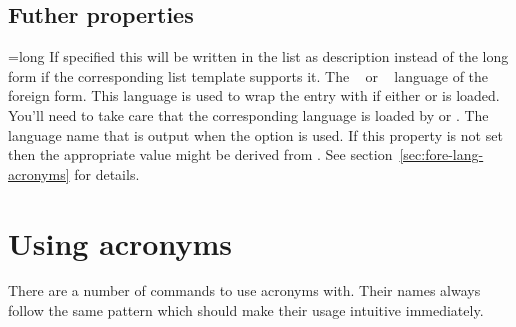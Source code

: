 \documentclass{acro-manual}
\begin{document}
\subsection{Futher properties}\label{sec:futher-properties}
\begin{properties}
  \Default={long}
    If specified this will be written in the list as description instead of
    the long form if the corresponding list template supports it.
  \Default
    The ~\cite{pkg:babel} or
    ~\cite{pkg:polyglossia} language of the foreign form.
    This language is used to wrap the entry with
     if either  or
     is loaded.  You'll need to take care that the
    corresponding language is loaded by  or .
  \Default
    The language name that is output when the option
    \code{/} is used.  If this property is not
    set then the appropriate value might be derived from
    . See section~\vref{sec:fore-lang-acronyms} for
    details.
\end{properties}

\section{Using acronyms}\label{sec:using-acronyms}
There are a number of commands to use acronyms with. Their names always follow
the same pattern which should make their usage intuitive immediately.
\end{document}
